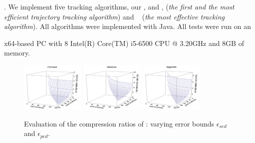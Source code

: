 .
We implement five tracking algorithms, \ie our \citt, \sitt and \bitt, \ldrh \cite{Trajcevski:LDRH} (\emph{the first and the most efficient trajectory tracking algorithm}) and \grts~\cite{Lange:GRTS,Lange:Tracking} (\emph{the most effective tracking algorithm}).
All algorithms were implemented with Java.
All tests were run on an {x64-based  PC with 8 Intel(R) Core(TM) i5-6500 CPU @ 3.20GHz and 8GB of memory.
	
	
	


\begin{figure}[tb!]
	\centering
	\includegraphics[width= 0.27\textwidth]{figures/Fig-BITT-mopsi-compression-ratio.png}\hspace{6ex}
	\includegraphics[width= 0.27\textwidth]{figures/Fig-BITT-sercar-compression-ratio.png}\hspace{6ex}
	\includegraphics[width= 0.27\textwidth]{figures/Fig-BITT-geolife-compression-ratio.png}\hspace{0ex}
	\vspace{-2ex}
	\caption{\small Evaluation of the compression ratios of \bitt: varying error bounds $\epsilon_{sed}$ and $\epsilon_{ped}$.}
	\label{fig:bitt-compression-ratio}
	\vspace{-1ex}
\end{figure}


}
